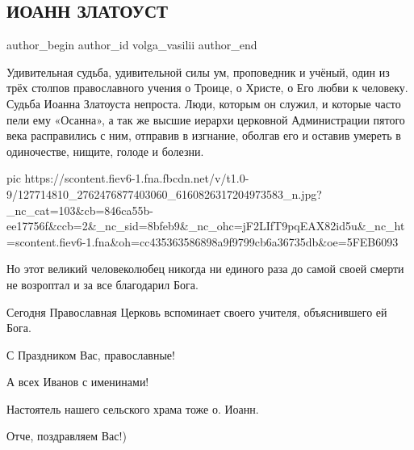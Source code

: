  
 
 
 
 
 
\subsection{ИОАНН ЗЛАТОУСТ}
\label{sec:26_11_2020.fb.volga_vasilii.1.ioann_zlatoust}
\ifcmt
	author_begin
   author_id volga_vasilii
	author_end
\fi

Удивительная судьба, удивительной силы ум, проповедник и учёный, один из трёх
столпов православного учения о Троице, о Христе, о Его любви к человеку.
Судьба Иоанна Златоуста непроста. Люди, которым он служил, и которые часто пели
ему «Осанна», а так же высшие иерархи церковной Администрации пятого века
расправились с ним, отправив в изгнание, оболгав его и оставив умереть в
одиночестве, нищите, голоде и болезни. 

\ifcmt
pic https://scontent.fiev6-1.fna.fbcdn.net/v/t1.0-9/127714810_2762476877403060_6160826317204973583_n.jpg?_nc_cat=103&cb=846ca55b-ee17756f&ccb=2&_nc_sid=8bfeb9&_nc_ohc=jF2LIfT9pqEAX82id5u&_nc_ht=scontent.fiev6-1.fna&oh=cc435363586898a9f9799cb6a36735db&oe=5FEB6093
\fi

Но этот великий человеколюбец никогда ни единого раза до самой своей смерти не возроптал и за все благодарил Бога.

Сегодня Православная Церковь вспоминает своего учителя, объяснившего ей Бога. 

С Праздником Вас, православные!

А всех Иванов с именинами!

Настоятель нашего сельского храма тоже о. Иоанн.

Отче, поздравляем Вас!)
